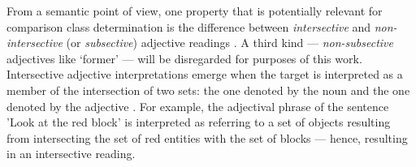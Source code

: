 From a semantic point of view, one property that is potentially relevant for comparison class determination is the difference between \textit{intersective} and \textit{non-intersective} (or \textit{subsective}) adjective readings \parencite{sedivy1999, kennedy2012, hofherr2010adjectives}. A third kind --- \textit{non-subsective} adjectives like ‘former’ --- will be disregarded for purposes of this work. 
Intersective adjective interpretations emerge when the target is interpreted as a member of the intersection of two sets: the one denoted by the noun and the one denoted by the adjective \parencite{kennedy2012}. For example, the adjectival phrase of the sentence 'Look at the red block' is interpreted as referring to a set of objects resulting from intersecting the set of red entities with the set of blocks --- hence, resulting in an intersective reading.
